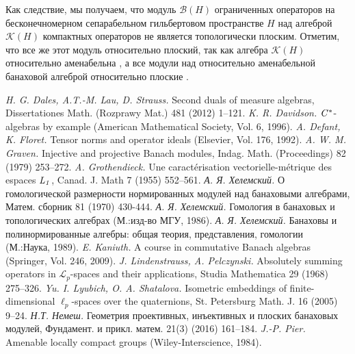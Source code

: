 \documentclass[12pt]{article}
\begin{document}
Как следствие, мы получаем, что модуль $\mathcal{B}(H)$ ограниченных операторов на бесконечномерном сепарабельном гильбертовом пространстве $H$ над алгеброй $\mathcal{K}(H)$ компактных операторов не является топологически плоским. Отметим, что все же этот модуль относительно плоский, так как алгебра $\mathcal{K}(H)$ относительно аменабельна \cite[VII.1.89]{HelBanLocConvAlg}, а все модули над относительно аменабельной банаховой алгеброй относительно плоские \cite[VII.1.60(I)]{HelBanLocConvAlg}.


\begin{thebibliography}{999}

\textit{H. G. Dales, A.T.-M. Lau, D. Strauss.} Second duals of measure algebras, Dissertationes Math. (Rozprawy Mat.) 481 (2012) 1--121.
%
\textit{K. R. Davidson.} $\it{C^*}$-algebras by example (American Mathematical Society, Vol. 6, 1996).
%
\textit{A. Defant, K. Floret.} Tensor norms and operator ideals (Elsevier, Vol. 176, 1992).
%
\textit{A. W. M. Graven.} Injective and projective Banach modules, Indag. Math. (Proceedings) 82 (1979) 253--272.
%
\textit{A. Grothendieck.} Une caract{\'e}risation vectorielle-m{\'e}trique des espaces $\it{L}_1$, Canad. J. Math 7 (1955) 552--561.
%
\textit{А. Я. Хелемский.} О гомологической размерности нормированных модулей над банаховыми алгебрами, Матем. сборник 81 (1970) 430-444.
%
\textit{А. Я. Хелемский.} Гомология в банаховых и топологических алгебрах (М.:изд-во МГУ, 1986).
%
\textit{А. Я. Хелемский.} Банаховы и полинормированные алгебры: общая теория, представления, гомологии (М.:Наука, 1989).
%
\textit{E. Kaniuth.} A course in commutative Banach algebras (Springer, Vol. 246, 2009).
%
\textit{J. Lindenstrauss, A. Pelczynski.} Absolutely summing operators in $\mathcal{L}_p$-spaces and their applications, Studia Mathematica 29 (1968) 275--326.
%
\textit{Yu. I. Lyubich, O. A. Shatalova.} Isometric embeddings of finite-dimensional $\ell_p$-spaces over the quaternions, St. Petersburg Math. J. 16 (2005) 9--24.
%
\textit{Н.Т. Немеш.} Геометрия проективных, инъективных и плоских банаховых модулей, Фундамент. и прикл. матем. 21(3) (2016) 161--184.
%
\textit{J.-P. Pier.} Amenable locally compact groups (Wiley-Interscience, 1984).

\end{thebibliography}
\end{document}
